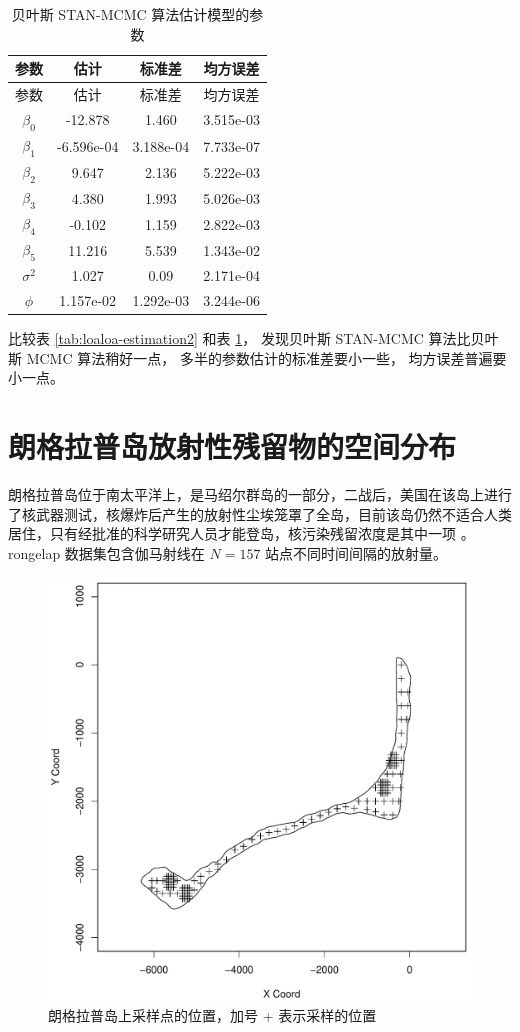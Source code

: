 \documentclass[12pt,a4paper,UTF8,twoside]{book}
\theoremstyle{definition}
\theoremstyle{definition}
\theoremstyle{definition}
\theoremstyle{remark}
\begin{document}
\begin{longtable}[]{@{}cccc@{}}
\caption{\label{tab:loaloa-estimation3} 贝叶斯 STAN-MCMC
算法估计模型的参数}\tabularnewline
\toprule
参数 & 估计 & 标准差 & 均方误差\tabularnewline
\midrule
\endfirsthead
\toprule
参数 & 估计 & 标准差 & 均方误差\tabularnewline
\midrule
\endhead
\(\beta_{0}\) & -12.878 & 1.460 & 3.515e-03\tabularnewline
\(\beta_{1}\) & -6.596e-04 & 3.188e-04 & 7.733e-07\tabularnewline
\(\beta_{2}\) & 9.647 & 2.136 & 5.222e-03\tabularnewline
\(\beta_{3}\) & 4.380 & 1.993 & 5.026e-03\tabularnewline
\(\beta_{4}\) & -0.102 & 1.159 & 2.822e-03\tabularnewline
\(\beta_{5}\) & 11.216 & 5.539 & 1.343e-02\tabularnewline
\(\sigma^2\) & 1.027 & 0.09 & 2.171e-04\tabularnewline
\(\phi\) & 1.157e-02 & 1.292e-03 & 3.244e-06\tabularnewline
\bottomrule
\end{longtable}

比较表 \ref{tab:loaloa-estimation2} 和表 \ref{tab:loaloa-estimation3}，
发现贝叶斯 STAN-MCMC 算法比贝叶斯 MCMC 算法稍好一点，
多半的参数估计的标准差要小一些， 均方误差普遍要小一点。

\hypertarget{rongelap}{%
\section{朗格拉普岛放射性残留物的空间分布}\label{rongelap}}

朗格拉普岛位于南太平洋上，是马绍尔群岛的一部分，二战后，美国在该岛上进行了核武器测试，核爆炸后产生的放射性尘埃笼罩了全岛，目前该岛仍然不适合人类居住，只有经批准的科学研究人员才能登岛，核污染残留浓度是其中一项
\citep{Bordner2016}。rongelap 数据集包含伽马射线在 \(N=157\)
站点不同时间间隔的放射量。

\begin{figure}

{\centering \includegraphics[width=0.7\linewidth]{figures/rongelap} 

}

\caption{朗格拉普岛上采样点的位置，加号 + 表示采样的位置}\label{fig:rongelap-dataset}
\end{figure}
\end{document}
